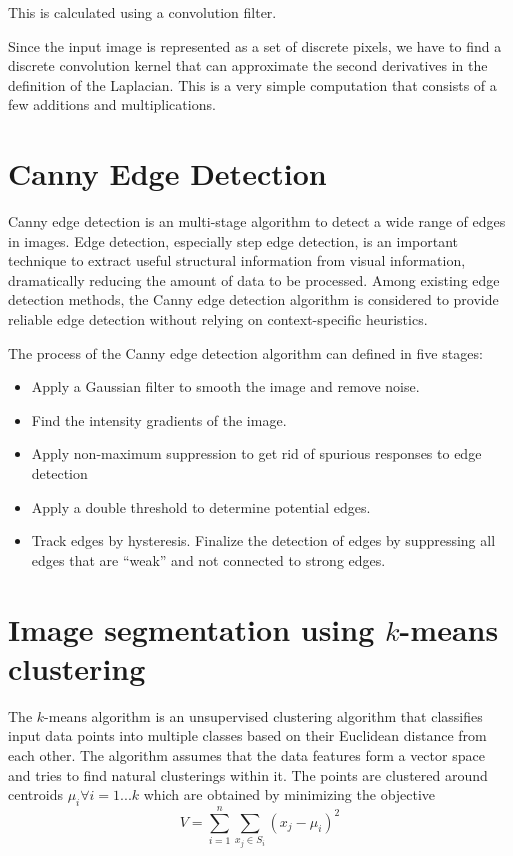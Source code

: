 \documentclass{osuthesis}
\begin{document}
					This is calculated using a convolution filter.
					
					Since the input image is represented as a set of discrete pixels, we
					have to find a discrete convolution kernel that can approximate the
					second derivatives in the definition of the Laplacian. This is a very
					simple computation that consists of a few additions and
					multiplications.
					
					\section{Canny Edge Detection}
					Canny edge detection\cite{Canny86} is an multi-stage algorithm to
					detect a wide range of edges in images. Edge detection, especially
					step edge detection, is an important technique to extract useful
					structural information from visual information, dramatically reducing
					the amount of data to be processed. Among existing edge detection
					methods, the Canny edge detection algorithm is considered to provide
					reliable edge detection without relying on context-specific
					heuristics.
					
					The process of the Canny edge detection algorithm can defined in five
					stages:
					
					\begin{itemize}
						\item Apply a Gaussian filter to smooth the image and remove noise.
						\item Find the intensity gradients of the image.
						\item Apply non-maximum suppression to get rid of spurious
						responses to edge detection
						\item Apply a double threshold to determine potential edges.
						\item Track edges by hysteresis. Finalize the detection of
						edges by suppressing all edges that are ``weak'' and not
						connected to strong edges.
						\end{itemize}
						
						\section{Image segmentation using $k$-means clustering}
						The $k$-means algorithm is an unsupervised clustering algorithm that
						classifies input data points into multiple classes based on their
						Euclidean distance from each other. The algorithm assumes that the
						data features form a vector space and tries to find natural
						clusterings within it. The points are clustered around
						centroids \begin{math}\mu_{i} \forall i = 1...k\end{math} which are
						obtained by minimizing the objective
						\begin{equation}
						V = \sum\limits_{i=1}^n \sum\limits_{x_{j}\in S_{i}} (x_{j} - \mu_{i})^2
						\end{equation}
						
\end{document}

